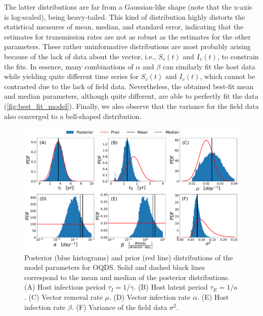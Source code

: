 The latter distributions are far from a Gaussian-like shape (note that the
x-axis is log-scaled), being heavy-tailed. This kind of distribution highly
distorts the statistical measures of mean, median, and standard error,
indicating that the estimates for transmission rates are not as robust as the
estimates for the other parameters. These rather uninformative distributions
are most probably arising because of the lack of data about the vector, i.e.,
$S_v(t)$ and $I_v(t)$, to constrain the fits. In essence, many combinations of
$\alpha$ and $\beta$ can similarly fit the host data while yielding quite
different time series for $S_v(t)$ and $I_v(t)$, which cannot be contrasted due
to the lack of field data. Nevertheless, the obtained best-fit mean and median
parameters, although quite different, are able to perfectly fit the data
(\cref{fig:best_fit_model}). Finally, we also observe that the variance for the
field data also converged to a bell-shaped distribution.

\begin{figure}[H]
    \centering
    \includegraphics[width=1\textwidth]{Figures/Parameter_estimates_OQDS.pdf}
    \caption[Posterior and prior distributions of the model parameters for
        OQDS]{Posterior (blue histograms) and prior (red line) distributions
        of the model parameters for OQDS. Solid and dashed black lines
        correspond to
        the mean and median of the posterior distributions. (A) Host infectious
        period
        $\tau_I=1/\gamma$. (B) Host latent period $\tau_E=1/\kappa$. (C) Vector
        removal
        rate $\mu$. (D) Vector infection rate $\alpha$. (E) Host infection rate
        $\beta$. (F) Variance of the field data $\sigma^2$.}
    \label{fig:parameter_estimates_OQDS}
\end{figure}


